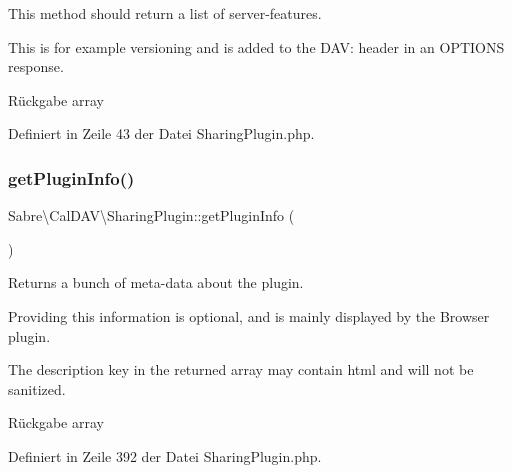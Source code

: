 This method should return a list of server-\/features.

This is for example \textquotesingle{}versioning\textquotesingle{} and is added to the D\+AV\+: header in an O\+P\+T\+I\+O\+NS response.

\begin{DoxyReturn}{Rückgabe}
array 
\end{DoxyReturn}


Definiert in Zeile 43 der Datei Sharing\+Plugin.\+php.

\mbox{\label{class_sabre_1_1_cal_d_a_v_1_1_sharing_plugin_aacea1dc5415fcb7f9da345e8511df024}} 
\subsubsection{\texorpdfstring{get\+Plugin\+Info()}{getPluginInfo()}}
{\footnotesize\ttfamily Sabre\textbackslash{}\+Cal\+D\+A\+V\textbackslash{}\+Sharing\+Plugin\+::get\+Plugin\+Info (\begin{DoxyParamCaption}{ }\end{DoxyParamCaption})}

Returns a bunch of meta-\/data about the plugin.

Providing this information is optional, and is mainly displayed by the Browser plugin.

The description key in the returned array may contain html and will not be sanitized.

\begin{DoxyReturn}{Rückgabe}
array 
\end{DoxyReturn}


Definiert in Zeile 392 der Datei Sharing\+Plugin.\+php.

\mbox{\label{class_sabre_1_1_cal_d_a_v_1_1_sharing_plugin_ac77288e24718a4705cd9f85388528852}} 
